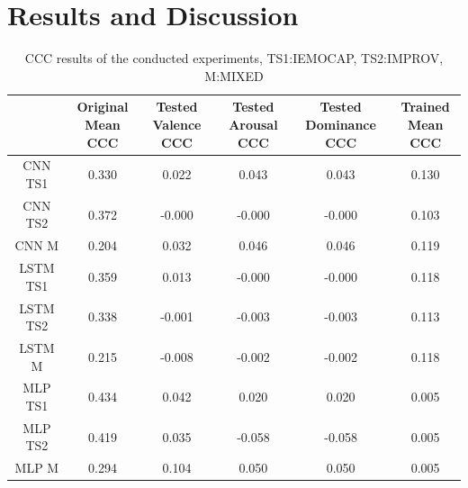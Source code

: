 \documentclass[a4paper,11pt]{article}
\begin{document}
\section{Results and Discussion} \label{sec:results}
\begin{table}[h]
    \centering
    \begin{tabular}{cccccc}
        \toprule
        {} &  \makecell{Original\\ Mean CCC} &  \makecell{Tested\\ Valence CCC} &  \makecell{Tested\\ Arousal CCC} &  \makecell{Tested\\ Dominance CCC} &  \makecell{Trained \\Mean CCC} \\
        \midrule
        CNN TS1  &              0.330 &               0.022 &               0.043 &                 0.043 &             0.130 \\ \midrule
        CNN TS2   &              0.372 &              -0.000 &              -0.000 &                -0.000 &             0.103 \\\midrule
        CNN M    &              0.204 &               0.032 &               0.046 &                 0.046 &             0.119 \\\midrule
        LSTM TS1 &              0.359 &               0.013 &              -0.000 &                -0.000 &             0.118 \\\midrule
        LSTM TS2  &              0.338 &              -0.001 &              -0.003 &                -0.003 &             0.113 \\\midrule
        LSTM M   &              0.215 &              -0.008 &              -0.002 &                -0.002 &             0.118 \\\midrule
        MLP TS1  &              0.434 &               0.042 &               0.020 &                 0.020 &             0.005 \\\midrule
        MLP TS2   &              0.419 &               0.035 &              -0.058 &                -0.058 &             0.005 \\\midrule
        MLP M    &              0.294 &               0.104 &               0.050 &                 0.050 &             0.005 \\
        \bottomrule
        \end{tabular}
        
    \caption{CCC results of the conducted experiments, TS1:IEMOCAP, TS2:IMPROV, M:MIXED}
    \label{tab:CCCloss}
\end{table}
\end{document}
